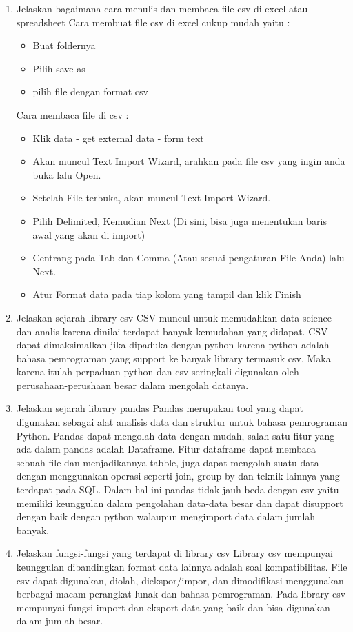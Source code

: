 \begin{enumerate}
\item Jelaskan bagaimana cara menulis dan membaca file csv di excel atau spreadsheet
 Cara membuat file csv di excel cukup mudah yaitu :
\begin{itemize}
	\item Buat foldernya
	\item Pilih save as
	\item pilih file dengan format csv
\end{itemize}
Cara membaca file di csv :
\begin{itemize}
	\item Klik data - get external data - form text
	\item Akan muncul Text Import Wizard, arahkan pada file csv yang ingin anda buka lalu Open.
	\item Setelah File terbuka, akan muncul Text Import Wizard.
	\item Pilih Delimited, Kemudian Next (Di sini, bisa juga menentukan baris awal yang akan di import)
	\item Centrang pada Tab dan Comma (Atau sesuai pengaturan File Anda) lalu Next.
	\item Atur Format data pada tiap kolom yang tampil dan klik Finish
\end{itemize}

\item Jelaskan sejarah library csv
 CSV muncul untuk memudahkan data science dan analis karena dinilai terdapat banyak kemudahan yang didapat. CSV dapat dimaksimalkan jika dipaduka dengan python karena python adalah bahasa pemrograman yang support ke banyak library termasuk csv. Maka karena itulah perpaduan python dan csv seringkali digunakan oleh perusahaan-perushaan besar dalam mengolah datanya.

\item Jelaskan sejarah library pandas
Pandas merupakan tool yang dapat digunakan sebagai alat analisis data dan struktur untuk bahasa pemrograman Python. Pandas dapat mengolah data dengan mudah, salah satu fitur yang ada dalam pandas adalah Dataframe. Fitur dataframe dapat membaca sebuah file dan menjadikannya tabble, juga dapat mengolah suatu data dengan menggunakan operasi seperti join, group by dan teknik lainnya yang terdapat pada SQL. Dalam hal ini pandas tidak jauh beda dengan csv yaitu memiliki keunggulan dalam pengolahan data-data besar dan dapat disupport dengan baik dengan python walaupun mengimport data dalam jumlah banyak.

\item Jelaskan fungsi-fungsi yang terdapat di library csv
 Library csv mempunyai keunggulan dibandingkan format data lainnya adalah soal kompatibilitas. File csv dapat digunakan, diolah, diekspor/impor, dan dimodifikasi menggunakan berbagai macam perangkat lunak dan bahasa pemrograman. Pada library csv mempunyai fungsi import dan eksport data yang baik dan bisa digunakan dalam jumlah besar.


\end{enumerate}
